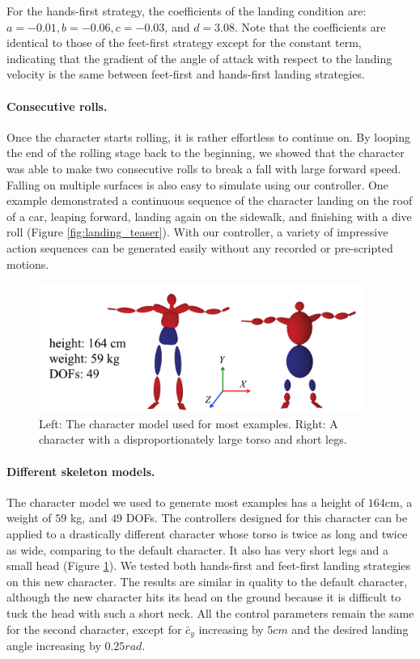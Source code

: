 For the hands-first strategy, the coefficients of the landing condition
are: $a = -0.01, b = -0.06, c = -0.03$, and $d = 3.08$. Note that the
coefficients are identical to those of the feet-first strategy except
for the constant term, indicating that the gradient of the angle of
attack with respect to the landing velocity is the same between
feet-first and hands-first landing strategies. 

\paragraph{Consecutive rolls.}
Once the character starts rolling, it is rather effortless to continue
on. By looping the end of the rolling stage back to the beginning, we
showed that the character was able to make two consecutive rolls to
break a fall with large forward speed. Falling on multiple surfaces is
also easy to simulate using our controller. One example demonstrated a
continuous sequence of the character landing on the roof of a car,
leaping forward, landing again on the sidewalk, and finishing with a
dive roll (Figure \ref{fig:landing_teaser}). With our controller, a variety of
impressive action sequences can be generated easily without any
recorded or pre-scripted motions.
\begin{figure}[ht]
\center
  \includegraphics[width=4.2in]{images/diffSkel1}
  \caption{
    Left: The character model used for most examples. Right: A
    character with a disproportionately large torso and short legs.
  }
 \label{fig:landing_models}
\end{figure}
\paragraph{Different skeleton models.}
The character model we used to generate most examples has a height of
$164$cm, a weight of $59$ kg, and $49$ DOFs. The controllers designed
for this character can be applied to a drastically different character
whose torso is twice as long and twice as wide, comparing to the
default character. It also has very short legs and a small head
(Figure \ref{fig:landing_models}). We tested both hands-first and feet-first
landing strategies on this new character. The results are similar in
quality to the default character, although the new character hits its
head on the ground because it is difficult to tuck the head with such
a short neck.
All the control parameters remain the same for the second
character, except for $\bar{c}_y$ increasing by  $5cm$ and the
desired landing angle increasing by $0.25 rad$.


